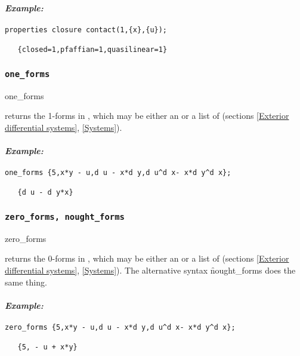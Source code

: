 \paragraph{\it Example:}
\begin{verbatim}
properties closure contact(1,{x},{u});

   {closed=1,pfaffian=1,quasilinear=1}
\end{verbatim}


\subsubsection{\tt one\_forms}
\label{one_forms}

\begin{edssyntax}
	one\_forms 
\end{edssyntax}
returns the 1-forms in , which may be either an  or a
list of  (sections \ref{Exterior differential systems},
\ref{Systems}).

\paragraph{\it Example:}
\begin{verbatim}
one_forms {5,x*y - u,d u - x*d y,d u^d x- x*d y^d x};

   {d u - d y*x} 
\end{verbatim}

\subsubsection{\tt zero\_forms, nought\_forms}
\label{zero_forms}

\begin{edssyntax}
	zero\_forms 
\end{edssyntax}
returns the 0-forms in , which may be either an  or a
list of  (sections \ref{Exterior differential systems},
\ref{Systems}). The alternative syntax \f{nought\_forms} does the same thing.

\paragraph{\it Example:}
\begin{verbatim}
zero_forms {5,x*y - u,d u - x*d y,d u^d x- x*d y^d x};

   {5, - u + x*y} 
\end{verbatim}

